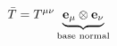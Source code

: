 \documentclass[preview]{standalone}
\begin{document}
\begin{align*}
\Bar{T} = T^{\mu\nu} \underbrace{\textbf{e}_{\mu}\otimes \textbf{e}_{\nu}}_{\text{base normal}}
\end{align*}
\end{document}
